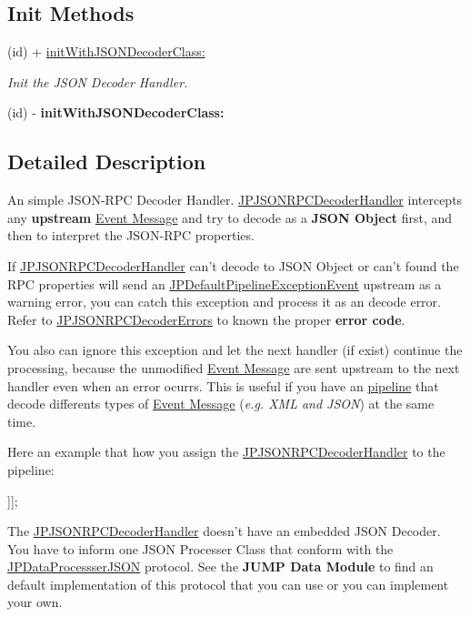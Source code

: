 \subsection*{Init Methods}
\begin{DoxyCompactItemize}
\item 
(id) + \hyperlink{a00015_a35ae826d8a4a5a44ffc17ed495b97bee}{initWithJSONDecoderClass:}
\begin{DoxyCompactList}\small\item\em Init the JSON Decoder Handler. \item\end{DoxyCompactList}\item 
\hypertarget{a00015_a35ae826d8a4a5a44ffc17ed495b97bee}{
(id) -\/ {\bfseries initWithJSONDecoderClass:}}
\label{a00015_a35ae826d8a4a5a44ffc17ed495b97bee}

\end{DoxyCompactItemize}


\subsection{Detailed Description}
An simple JSON-\/RPC Decoder Handler. \hyperlink{a00015}{JPJSONRPCDecoderHandler} intercepts any {\bfseries upstream} \hyperlink{a00006}{Event Message} and try to decode as a {\bfseries JSON Object} first, and then to interpret the JSON-\/RPC properties. 

If \hyperlink{a00015}{JPJSONRPCDecoderHandler} can't decode to JSON Object or can't found the RPC properties will send an \hyperlink{a00013}{JPDefaultPipelineExceptionEvent} upstream as a warning error, you can catch this exception and process it as an decode error. Refer to \hyperlink{a00015_aba2b766c1b7742f5c636bbbd578df618}{JPJSONRPCDecoderErrors} to known the proper {\bfseries error code}. 

You also can ignore this exception and let the next handler (if exist) continue the processing, because the unmodified \hyperlink{a00006}{Event Message} are sent upstream to the next handler even when an error ocurrs. This is useful if you have an \hyperlink{a00001}{pipeline} that decode differents types of \hyperlink{a00006}{Event Message} ({\itshape e.g. XML and JSON\/}) at the same time. 

Here an example that how you assign the \hyperlink{a00015}{JPJSONRPCDecoderHandler} to the pipeline: 
\begin{DoxyCode}
 [pipeline addLast:@"JSONRPCDecoder" withHandler:[JPJSONRPCDecoderHandler initWit
      hJSONDecoderClass:[JSONEncoder class]]];
\end{DoxyCode}
 The \hyperlink{a00015}{JPJSONRPCDecoderHandler} doesn't have an embedded JSON Decoder. You have to inform one JSON Processer Class that conform with the \hyperlink{a00009}{JPDataProcessserJSON} protocol. See the {\bfseries JUMP Data Module} to find an default implementation of this protocol that you can use or you can implement your own. 

